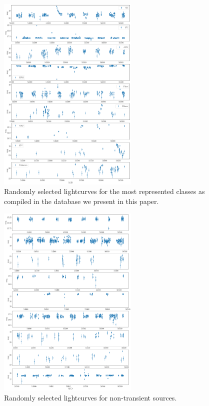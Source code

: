 \documentclass[a4paper,fleqn,usenatbib]{mnras}
\begin{document}
\begin{figure}
  \includegraphics[width=0.6\textwidth]{examples_transient.pdf}
  \caption{Randomly selected lightcurves for the most represented classes as
    compiled in the database we present in this paper.}  
  \label{fig:examples_transient}
\end{figure} 


\begin{figure}
  \includegraphics[width=0.6\textwidth]{examples_nontransient.pdf}
  \caption{Randomly selected lightcurves for non-transient sources.}
  \label{fig:examples_non_transient}
\end{figure} 
\end{document}
